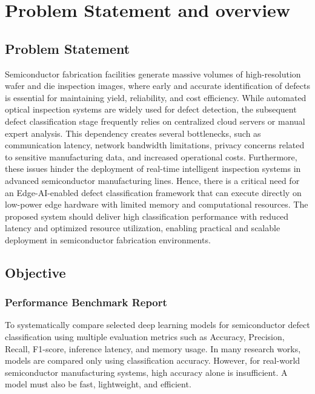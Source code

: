 \chapter{Problem Statement and overview}

\section{Problem Statement}
Semiconductor fabrication facilities generate massive volumes of high-resolution wafer and die inspection images, where early and accurate identification of defects is essential for maintaining yield, reliability, and cost efficiency. While automated optical inspection systems are widely used for defect detection, the subsequent defect classification stage frequently relies on centralized cloud servers or manual expert analysis.
This dependency creates several bottlenecks, such as communication latency, network bandwidth limitations, privacy concerns related to sensitive manufacturing data, and increased operational costs. Furthermore, these issues hinder the deployment of real-time intelligent inspection systems in advanced semiconductor manufacturing lines.
Hence, there is a critical need for an Edge-AI-enabled defect classification framework that can execute directly on low-power edge hardware with limited memory and computational resources. The proposed system should deliver high classification performance with reduced latency and optimized resource utilization, enabling practical and scalable deployment in semiconductor fabrication environments.

\section{Objective}
\subsection {Performance Benchmark Report}
To systematically compare selected deep learning models for semiconductor defect classification using multiple evaluation metrics such as Accuracy, Precision, Recall, F1-score, inference latency, and memory usage.
In many research works, models are compared only using classification accuracy. However, for real-world semiconductor manufacturing systems, high accuracy alone is insufficient. A model must also be fast, lightweight, and efficient.

